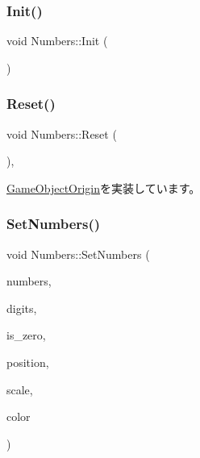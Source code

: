 \subsubsection{\texorpdfstring{Init()}{Init()}}
{\footnotesize\ttfamily void Numbers\+::\+Init (\begin{DoxyParamCaption}{ }\end{DoxyParamCaption})}

\mbox{\label{class_numbers_a1ab67e439ba1695c8fd545dfc1650990}} 
\subsubsection{\texorpdfstring{Reset()}{Reset()}}
{\footnotesize\ttfamily void Numbers\+::\+Reset (\begin{DoxyParamCaption}{ }\end{DoxyParamCaption})\hspace{0.3cm}{\ttfamily [override]}, {\ttfamily [virtual]}}



\mbox{\hyperlink{class_game_object_origin_af9af378a4fd9028316a6fdb461ed6a10}{Game\+Object\+Origin}}を実装しています。

\mbox{\label{class_numbers_aeb51ecf4e148f4ca67ac7788e061f94d}} 
\subsubsection{\texorpdfstring{Set\+Numbers()}{SetNumbers()}}
{\footnotesize\ttfamily void Numbers\+::\+Set\+Numbers (\begin{DoxyParamCaption}\item[{int}]{numbers,  }\item[{int}]{digits,  }\item[{bool}]{is\+\_\+zero,  }\item[{\mbox{\hyperlink{_vector3_d_8h_a5ef6e95dfc5f9d3820b71772d99bbc25}{Vec2}}}]{position,  }\item[{\mbox{\hyperlink{_vector3_d_8h_a5ef6e95dfc5f9d3820b71772d99bbc25}{Vec2}}}]{scale,  }\item[{\mbox{\hyperlink{_vector3_d_8h_a680c30c4a07d86fe763c7e01169cd6cc}{X\+Color4}}}]{color }\end{DoxyParamCaption})}

